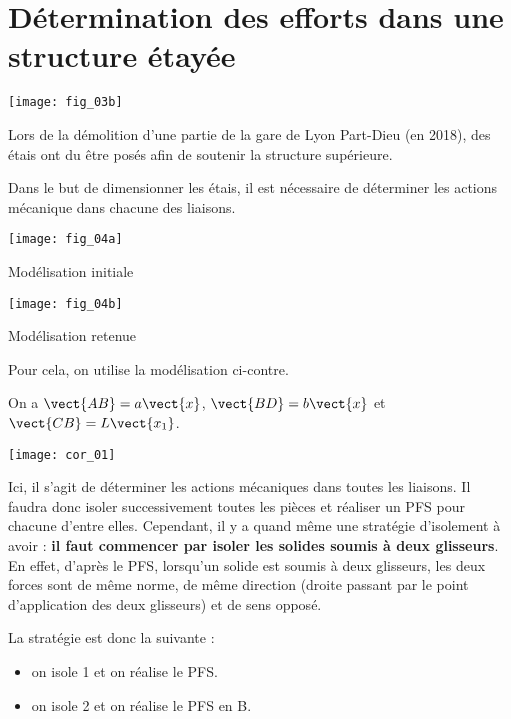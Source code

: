 \newpage

\section*{Détermination des efforts dans une structure étayée}
\ifprof
\else

\begin{marginfigure}
\texttt{[image: fig\_03b]}
\end{marginfigure}

Lors de la démolition d'une partie de la gare de Lyon Part-Dieu (en 2018), des étais ont du être posés afin de soutenir la structure supérieure. 


Dans le but de dimensionner les étais, il est nécessaire de déterminer les actions mécanique dans chacune des liaisons. 


\begin{marginfigure}
\centering
\texttt{[image: fig\_04a]}
\caption{Modélisation initiale}
\end{marginfigure}


\begin{marginfigure}
\centering
\texttt{[image: fig\_04b]}
\caption{Modélisation retenue}
\end{marginfigure}

Pour cela, on utilise la modélisation ci-contre. 



On a $\vect{AB}=a \vect{x}$,  $\vect{BD}=b \vect{x}$ et  $\vect{CB}=L \vect{x_1}$.
\fi

\ifprof
\begin{corrige}
\begin{center}
\texttt{[image: cor\_01]}
\end{center}

\end{corrige}
\else
\fi

\ifprof
\begin{corrige}
Ici, il s'agit de déterminer les actions mécaniques dans toutes les liaisons. Il faudra donc isoler successivement toutes les pièces et réaliser un PFS pour chacune d'entre elles. Cependant, il y a quand même une stratégie d'isolement à avoir : \textbf{il faut commencer par isoler les solides soumis à deux glisseurs}. En effet, d'après le PFS, lorsqu'un solide est soumis à deux glisseurs, les deux forces sont de même norme, de même direction (droite passant par le point d'application des deux glisseurs) et de sens opposé. 

La stratégie est donc la suivante : 
\begin{itemize}
\item on isole 1 et on réalise le PFS. 
\item on isole 2 et on réalise le PFS en B. 
\end{itemize} 


\end{corrige}
\else
\fi


